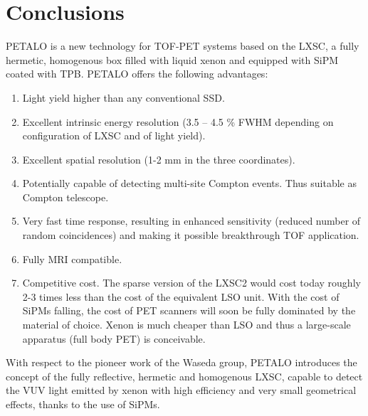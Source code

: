 \documentclass[12pt,a4paper,english,twoside]{article}
\begin{document}







%


%

\section{Conclusions}
\label{sec.conclu}

PETALO is a new technology for TOF-PET systems based on the LXSC, a fully hermetic, homogenous box filled with liquid xenon and equipped with SiPM coated with TPB. PETALO offers the following advantages:

\begin{enumerate}
\item Light yield higher than any conventional SSD.
\item Excellent intrinsic energy resolution (3.5 -- 4.5 \% FWHM depending on configuration of LXSC and of light yield). 
\item Excellent spatial resolution (1-2 mm in the three coordinates).
\item Potentially capable of detecting multi-site Compton events. Thus suitable as Compton telescope.
\item Very fast time response, resulting in enhanced sensitivity (reduced number of random coincidences) and making it possible breakthrough TOF application. 
\item Fully MRI compatible. 
\item Competitive cost. The sparse version of the LXSC2 would cost today roughly 2-3 times less than the cost of the equivalent LSO unit. With the cost of SiPMs falling, the  cost of PET scanners will soon be fully dominated by the material of choice. Xenon is much cheaper than LSO and thus a large-scale apparatus (full body PET) is conceivable. 
\end{enumerate}

With respect to the pioneer work of the Waseda group, PETALO introduces the concept of the fully reflective, hermetic and homogenous LXSC, capable to detect the VUV light emitted by xenon with high efficiency and very small geometrical effects, thanks to the use of SiPMs. 

\end{document}
